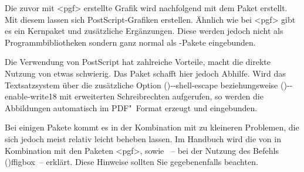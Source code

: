 \documentclass[%
  english,ngerman,%
  cdgeometry=no,DIV=12,%
  cd=false,cdfont=false,cdtitle=true,%
  headings=normal,%
  automark,%
  listof=toc,%
]{tudscrartcl}
\begin{document}
Die zuvor mit <pgf> erstellte Grafik wird nachfolgend mit dem 
Paket  erstellt. Mit diesem lassen sich PostScript-Grafiken 
erstellen. Ähnlich wie bei <pgf> gibt es ein Kernpaket und 
zusätzliche Ergänzungen. Diese werden jedoch nicht als Programmbibliotheken 
sondern ganz normal als -Pakete eingebunden.
%
\begin{Hint}
\usepackage{pstricks,pst-node}
\end{Hint}
%
Die Verwendung von PostScript hat zahlreiche Vorteile, macht die direkte 
Nutzung von  etwas schwierig. Das Paket  
schafft hier jedoch Abhilfe. Wird das Textsatzsystem  über die 
zusätzliche Option \Option(){-{}-shell-escape} beziehungsweise 
\Option(){-{}-enable-write18} mit erweiterten Schreibrechten 
aufgerufen, so werden die Abbildungen automatisch im PDF"~Format erzeugt und 
eingebunden.
%
\begin{Hint}
\usepackage{auto-pst-pdf}
\end{Hint}
%
Bei einigen Pakete kommt es in der Kombination mit  zu 
kleineren Problemen, die sich jedoch meist relativ leicht beheben lassen. Im 
Handbuch wird die  
von  in Kombination mit den Paketen <pgf>, 
 sowie ~-- bei der Nutzung des Befehls 
\Macro(){ffigbox}~-- erklärt. Diese Hinweise sollten Sie 
gegebenenfalls beachten.
\end{document}
